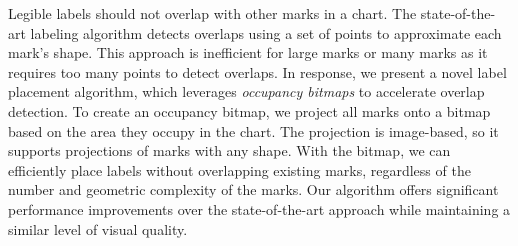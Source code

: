 Legible labels should not overlap with other marks in a chart.
The state-of-the-art labeling algorithm detects overlaps using a set of points to approximate each mark's shape.
This approach is inefficient for large marks or many marks as it requires too many points to detect overlaps.
In response, we present a novel label placement algorithm, which leverages \emph{occupancy bitmaps} to accelerate overlap detection.
To create an occupancy bitmap, we project all marks onto a bitmap based on the area they occupy in the chart.
The projection is image-based, so it supports projections of marks with any shape.
With the bitmap, we can efficiently place labels without overlapping existing marks,
regardless of the number and geometric complexity of the marks.
Our algorithm offers significant performance improvements over the state-of-the-art approach
while maintaining a similar level of visual quality.